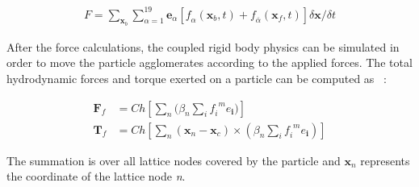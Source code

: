 \begin{align}
\mathit{F} = 
\sum\limits_{\mathbf{x}_{b}}\sum\limits_{\alpha=1}^{19}{\mathbf{e}_{\alpha}[\mathit{f}_{\alpha}(\mathbf{x}_{b},t)+\mathit{f}_{\overline{\alpha}}(\mathbf{x}_{f},t)]
 \delta \mathbf{x} / \delta t}
\end{align}

After the force calculations, the coupled rigid body physics can be simulated 
in order to move the particle agglomerates according to the applied forces. The 
total hydrodynamic forces and torque exerted on a particle can be computed as 
~\citep{Cook2004, Noble1998}:

\begin{align}
\mathbf{F}_{f} & = \mathit{Ch}[\sum\limits_{\mathit{n}}{(\beta_{\mathit{n}} 
\sum\limits_{\mathit{i}}{\mathit{f_i}^{\mathit{ m}}\mathbf{\mathit{e}_i}}})] \\ 
\mathbf{T}_{f} & = 
\mathit{Ch}[\sum\limits_{\mathit{n}}{(\mathbf{x}_{\mathit{n}}-\mathbf{x}_{\mathit{c}})
 \times (\beta_{\mathit{n}} \sum\limits_{\mathit{i}}{\mathit{f_i}^{\mathit{ 
m}}\mathbf{\mathit{e}_i}})}]
\end{align}

The summation is over all lattice nodes covered by the particle and 
$\mathbf{x}_{\mathit{n}}$ represents the coordinate of the lattice node 
\textit{n}.

